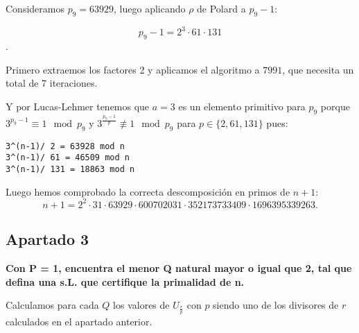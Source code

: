 \documentclass[a4paper]{article}
\begin{document}
Consideramos $p_9=63929$, luego aplicando $\rho$ de Polard a $p_9-1$:

$$p_9-1=2^3 \cdot 61\cdot 131$$.

Primero extraemos los factores 2 y aplicamos el algoritmo a $7991$, que necesita un total de 7 iteraciones.

Y por Lucas-Lehmer tenemos que $a=3$ es un elemento primitivo para $p_9$ porque $3^{p_9-1}\equiv 1\mod p_9$ y $3^{\frac{p_9-1}{p}}\not\equiv 1\mod p_9 $ para $p\in\{2, 61,131\}$ pues:

\begin{verbatim}
3^(n-1)/ 2 = 63928 mod n
3^(n-1)/ 61 = 46509 mod n
3^(n-1)/ 131 = 18863 mod n
\end{verbatim}


Luego hemos comprobado la correcta descomposición en primos de $n+1$:
$$n+1 = 2^2\cdot 31 \cdot 63929\cdot 600702031\cdot 352173733409\cdot 1696395339263.$$


\subsection{Apartado 3}

\textbf{Con P = 1, encuentra el menor Q natural mayor o igual que 2, tal que defina una s.L. que certifique la primalidad de n.}

Calculamos para cada $Q$ los valores de $U_{\frac{r}{p}}$ con $p$ siendo uno de los divisores de $r$ calculados en el apartado anterior.
\end{document}
